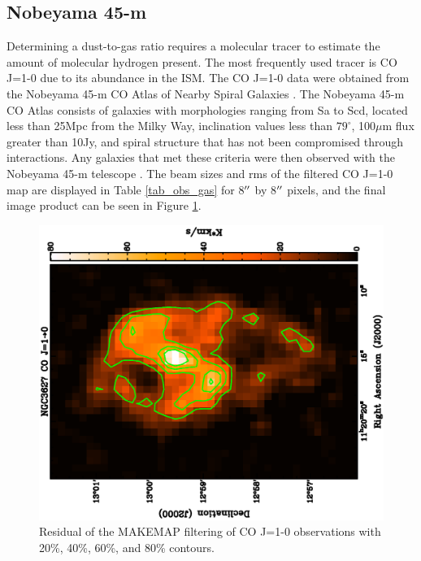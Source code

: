 
\subsection{Nobeyama 45-m}\label{nob_sec}

Determining a dust-to-gas ratio requires a molecular tracer to estimate the amount of molecular hydrogen present.  The most frequently used tracer is CO J=1-0 due to its abundance in the ISM.  The CO J=1-0 data were obtained from the Nobeyama 45-m CO Atlas of Nearby Spiral Galaxies \citep{kuno2007}.  The Nobeyama 45-m CO Atlas consists of galaxies with morphologies ranging from Sa to Scd, located less than 25Mpc from the Milky Way, inclination values less than $79^{\circ}$, 100$\mu$m flux greater than 10Jy, and spiral structure that has not been compromised through interactions.  Any galaxies that met these criteria were then observed with the Nobeyama 45-m telescope \citep{kuno2007}.  The beam sizes and rms of the filtered CO J=1-0 map are displayed in Table \ref{tab_obs_gas} for 8$\mbox{$^{\prime\prime}$}$ by 8$\mbox{$^{\prime\prime}$}$ pixels, and the final image product can be seen in Figure \ref{fig_co10}.

\begin{figure}
  \centering
  \includegraphics[width=1.\textwidth, angle=270]{obs_imgs/10_rem.eps}
  \caption[NGC3627 CO J=1-0 Observations]{Residual of the MAKEMAP filtering of CO J=1-0 observations with 20\%, 40\%, 60\%, and 80\% contours.}
  \label{fig_co10}
\end{figure}

